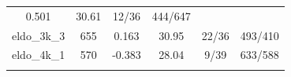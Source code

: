 \documentclass[]{article}
\begin{document}
\begin{longtable}[]{@{}cccccc@{}}
\begin{minipage}[t]{0.11\columnwidth}
0.501\strut
\end{minipage} & \begin{minipage}[t]{0.13\columnwidth}\centering\strut
30.61\strut
\end{minipage} & \begin{minipage}[t]{0.18\columnwidth}\centering\strut
12/36\strut
\end{minipage} & \begin{minipage}[t]{0.22\columnwidth}\centering\strut
444/647\strut
\end{minipage}\tabularnewline
\begin{minipage}[t]{0.11\columnwidth}\centering\strut
eldo\_3k\_3\strut
\end{minipage} & \begin{minipage}[t]{0.07\columnwidth}\centering\strut
655\strut
\end{minipage} & \begin{minipage}[t]{0.11\columnwidth}\centering\strut
0.163\strut
\end{minipage} & \begin{minipage}[t]{0.13\columnwidth}\centering\strut
30.95\strut
\end{minipage} & \begin{minipage}[t]{0.18\columnwidth}\centering\strut
22/36\strut
\end{minipage} & \begin{minipage}[t]{0.22\columnwidth}\centering\strut
493/410\strut
\end{minipage}\tabularnewline
\begin{minipage}[t]{0.11\columnwidth}\centering\strut
eldo\_4k\_1\strut
\end{minipage} & \begin{minipage}[t]{0.07\columnwidth}\centering\strut
570\strut
\end{minipage} & \begin{minipage}[t]{0.11\columnwidth}\centering\strut
-0.383\strut
\end{minipage} & \begin{minipage}[t]{0.13\columnwidth}\centering\strut
28.04\strut
\end{minipage} & \begin{minipage}[t]{0.18\columnwidth}\centering\strut
9/39\strut
\end{minipage} & \begin{minipage}[t]{0.22\columnwidth}\centering\strut
633/588\strut
\end{minipage}\tabularnewline
\begin{minipage}[t]{0.11\columnwidth}\centering\strut

\end{minipage}
\end{longtable}
\end{document}

